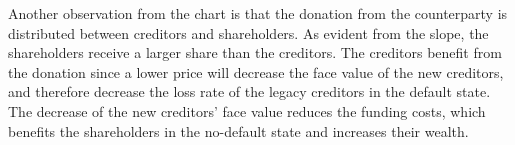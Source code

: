 \documentclass[main.tex]{subfiles}
\begin{document}
        Another observation from the chart is that the donation from the counterparty 
        is distributed between creditors and shareholders.
        As evident from the slope, the shareholders receive a larger share than the creditors.
        The creditors benefit from the donation since a lower price will
        decrease the face value of the new creditors, and therefore decrease the loss rate
        of the legacy creditors in the default state.
        The decrease of the new creditors' face value reduces the funding costs,
        which benefits the shareholders in the no-default state and increases their wealth.  
\end{document}
